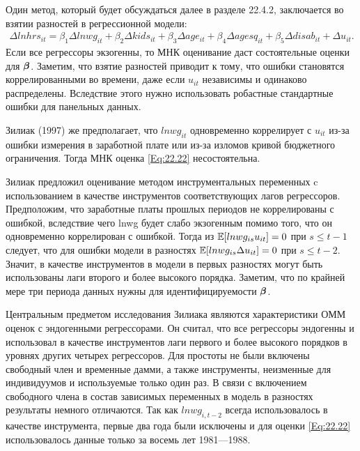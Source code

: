 Один метод, который будет обсуждаться далее в разделе 22.4.2, заключается во взятии разностей в регрессионной модели:
\begin{align}
\Delta lnhrs_{it}=\beta_1 \Delta lnwg_{it} + \beta_2\Delta kids_{it} +\beta_3 \Delta age_{it} + \beta_4 \Delta agesq_{it} + \beta_5 \Delta disab_{it} + \Delta u_{it}.
\label{Eq:22.22}
\end{align}
Если все регрессоры экзогенны, то МНК оценивание даст состоятельные оценки для $\bm{\beta}$. Заметим, что взятие разностей приводит к тому, что ошибки становятся коррелированными во времени, даже если $u_{it}$ независимы и одинаково распределены. Вследствие этого нужно использовать робастные стандартные ошибки для панельных данных.

Зилиак (1997) же предполагает, что $lnwg_{it}$ одновременно коррелирует с $u_{it}$ из-за ошибки измерения в заработной плате или из-за изломов кривой бюджетного ограничения. Тогда МНК оценка \ref{Eq:22.22} несостоятельна.

Зилиак предложил оценивание методом инструментальных переменных c использованием в качестве инструментов соответствующих лагов регрессоров. Предположим, что заработные платы прошлых периодов не коррелированы с ошибкой, вследствие чего lnwg будет слабо экзогенным помимо того, что он одновременно коррелирован с ошибкой. Тогда из $\mathbb{E}[lnwg_{is}u_{it}]=0$ при $s \leq t-1$ следует, что для ошибки модели в разностях $\mathbb{E}[lnwg_{is}\Delta u_{it}]=0$ при $s \leq t-2$. Значит, в качестве инструментов в модели в первых разностях могут быть использованы лаги второго и более высокого порядка. Заметим, что по крайней мере три периода данных нужны для идентифицируемости $\bm{\beta}$.

Центральным предметом исследования Зилиака являются характеристики ОММ оценок с эндогенными регрессорами. Он считал, что все регрессоры эндогенны и использовал в качестве инструментов лаги первого и более высокого порядков в уровнях других  четырех регрессоров. Для простоты не были включены свободный член и временные дамми, а также инструменты, неизменные для индивидуумов и используемые только один раз. В связи с включением свободного члена в состав зависимых переменных в модель в разностях результаты немного отличаются. Так как $lnwg_{i,t-2}$ всегда использовалось в качестве инструмента, первые два года были исключены и для оценки \ref{Eq:22.22} использовалось данные только за восемь лет 1981---1988.



